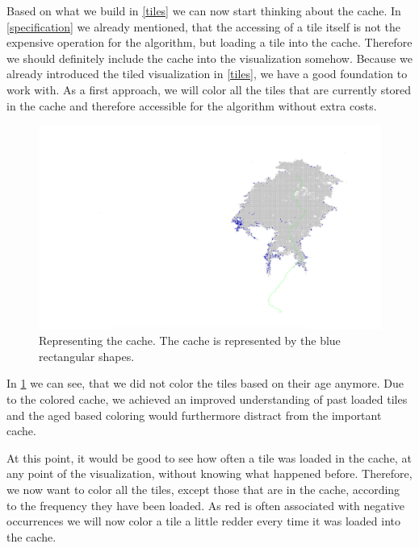 \documentclass
[
	paper = a4,
    pagesize,
	12 pt,
	oneside,                       %
    open = right,
	DIV = calc,
	BCOR = 0 mm,                   %
	bibtotoc
]
{scrbook}
\begin{document}
Based on what we build in \cref{tiles} we can now start thinking about the cache.
In \cref{specification} we already mentioned, that the accessing of a tile itself is not the expensive operation for the algorithm, but loading a tile into the cache.
Therefore we should definitely include the cache into the visualization somehow.
Because we already introduced the tiled visualization in \cref{tiles}, we have a good foundation to work with.
As a first approach, we will color all the tiles that are currently stored in the cache and therefore accessible for the algorithm without extra costs.

\begin{figure}[H]
    \includegraphics[width=\textwidth]{Images/vis-basic-cache.png}
\caption[]{Representing the cache. The cache is represented by the blue rectangular shapes.}
\label{fig:cache_coloring}
\end{figure}

In \cref{fig:cache_coloring} we can see, that we did not color the tiles based on their age anymore.
Due to the colored cache, we achieved an improved understanding of past loaded tiles and the aged based coloring would furthermore distract from the important cache.

At this point, it would be good to see how often a tile was loaded in the cache, at any point of the visualization, without knowing what happened before.
Therefore, we now want to color all the tiles, except those that are in the cache, according to the frequency they have been loaded.
As red is often associated with negative occurrences we will now color a tile a little redder every time it was loaded into the cache.
\end{document}

